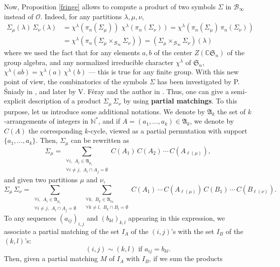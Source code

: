 \documentclass[smallextended,nospthms]{svjour3}
\theoremstyle{remark}
\newcommand{\N}{\mathbb{N}}
\newcommand{\C}{\mathbb{C}}
\newcommand{\sym}{\mathfrak{S}}
\newcommand{\obs}{\mathscr{O}}
\newcommand{\blg}{\mathscr{B}}
\newcommand{\arra}{\mathfrak{A}}
\begin{document}
Now, Proposition \ref{fringe} allows to compute a product of two symbols $\varSigma$ in $\blg_{\infty}$ instead of $\obs$. Indeed, for any partitions $\lambda,\mu,\nu$,
\begin{align*}
\varSigma_{\mu}(\lambda) \,\varSigma_{\nu}(\lambda)&=\chi^{\lambda}(\pi_{n}(\varSigma_{\mu}))\,\,\chi^{\lambda}(\pi_{n}(\varSigma_{\nu}))=\chi^{\lambda}(\pi_{n}(\varSigma_{\mu}) \, \pi_{n}(\varSigma_{\nu}))\\
&=\chi^{\lambda}(\pi_{n}(\varSigma_{\mu}\times_{\blg_{\infty}} \varSigma_{\nu}))=(\varSigma_{\mu}\times_{\blg_{\infty}} \varSigma_{\nu})(\lambda)
\end{align*}
where we used the fact that for any elements $a,b$ of the center $Z(\C\sym_{n})$ of the group algebra, and any normalized irreducible character $\chi^{\lambda}$ of $\sym_{n}$, $\chi^{\lambda}(ab)=\chi^{\lambda}(a)\,\chi^{\lambda}(b)$ --- this is true for any finite group. With this new point of view, the combinatorics of the symbols $\varSigma$ has been investigated by P. \'Sniady in \cite{Sni06a,Sni06b}, and later by V. F\'eray and the author in \cite{FM10}. Thus, one can give a semi-explicit description of a product $\varSigma_{\mu}\,\varSigma_{\nu}$ by using \textbf{partial matchings}. To this purpose, let us introduce some additional notations. We denote by $\arra_{k}$ the set of $k$-arrangements of integers in $\N^{*}$, and if $A=(a_{1},\ldots,a_{k})\in \arra_{k}$, we denote by $C(A)$ the corresponding $k$-cycle, viewed as a partial permutation with support $\{a_{1},\ldots,a_{k}\}$. Then, $\varSigma_{\mu}$ can be rewritten as
$$\varSigma_{\mu}=\sum_{\substack{\forall i,\,\,A_{i} \in \arra_{\mu_{i}} \\ \forall i \neq j,\,\,A_{i} \cap A_{j}=\emptyset}}C(A_{1})\,C(A_{2})\,\cdots \,C(A_{\ell(\mu)}),$$
and given two partitions $\mu$ and $\nu$,
$$\varSigma_{\mu}\,\varSigma_{\nu}=\!\!\sum_{\substack{\forall i,\,\,A_{i} \in \arra_{\mu_{i}} \\ \forall i \neq j,\,\,A_{i} \cap A_{j}=\emptyset}}\,\,\,\sum_{\substack{\forall k,\,\,B_{k} \in \arra_{\nu_{k}} \\ \forall k \neq l,\,\,B_{k} \cap B_{l}=\emptyset}} \!\!C(A_{1})\,\cdots \,C(A_{\ell(\mu)})\,C(B_{1})\,\cdots \,C(B_{\ell(\nu)}).$$
To any sequences $(a_{ij})_{i,j}$ and $(b_{kl})_{k,l}$ appearing in this expression, we associate a partial matching of the set $I_{A}$ of the $(i,j)$'s with the set $I_{B}$ of the $(k,l)$'s: 
$$(i,j) \sim (k,l)\text{ if }a_{ij}=b_{kl}.$$
Then, given a partial matching $M$ of $I_{A}$ with $I_{B}$, if we sum the products 
\end{document}
